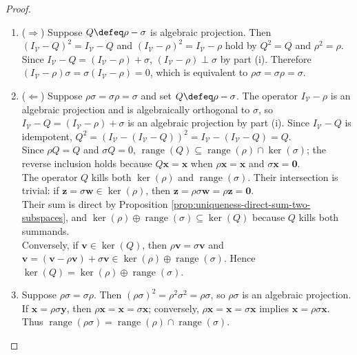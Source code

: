 \begin{theorem}
\begin{proof}
\begin{enumerate}[label=(\roman*)]
$(\rho+\sigma)\mathbf{v}=\mathbf{0}$ $\Rightarrow$ $\rho\mathbf{v}=\rho(\rho+\sigma)\mathbf{v}=\mathbf{0}$ and $\sigma\mathbf{v}=\sigma(\rho+\sigma)\mathbf{v}=\mathbf{0}$. Reverse implication is immediate. Thus $\ker(\rho+\sigma)=\ker(\rho)\cap\ker(\sigma)$.
\item[$(ii)$] ($\Rightarrow$) Suppose $Q\defeq\rho-\sigma$ is algebraic projection. Then $(I_{\mathcal{V}}-Q)^2=I_{\mathcal{V}}-Q$ and $(I_{\mathcal{V}}-\rho)^2=I_{\mathcal{V}}-\rho$ hold by $Q^2=Q$ and $\rho^2=\rho$.\\
Since $I_{\mathcal{V}}-Q=(I_{\mathcal{V}}-\rho)+\sigma$, $(I_{\mathcal{V}}-\rho)\perp\sigma$ by part (i). Therefore $(I_{\mathcal{V}}-\rho)\sigma=\sigma(I_{\mathcal{V}}-\rho)=0$, which is equivalent to $\rho\sigma=\sigma\rho=\sigma$.
\item[$(ii)$] ($\Leftarrow$) Suppose $\rho\sigma=\sigma\rho=\sigma$ and set $Q\defeq\rho-\sigma$. The operator $I_{\mathcal{V}}-\rho$ is an algebraic projection and is algebraically orthogonal to $\sigma$, so $I_{\mathcal{V}}-Q=(I_{\mathcal{V}}-\rho)+\sigma$ is an algebraic projection by part (i). Since $I_{\mathcal{V}}-Q$ is idempotent, $Q^2=(I_{\mathcal{V}}-(I_{\mathcal{V}}-Q))^2=I_{\mathcal{V}}-(I_{\mathcal{V}}-Q)=Q$.\\
Since $\rho Q=Q$ and $\sigma Q=0$, $\operatorname{range}(Q)\subseteq\operatorname{range}(\rho)\cap\ker(\sigma)$; the reverse inclusion holds because $Q\mathbf{x}=\mathbf{x}$ when $\rho\mathbf{x}=\mathbf{x}$ and $\sigma\mathbf{x}=\mathbf{0}$.\\
The operator $Q$ kills both $\ker(\rho)$ and $\operatorname{range}(\sigma)$. Their intersection is trivial: if $\mathbf{z}=\sigma\mathbf{w}\in\ker(\rho)$, then $\mathbf{z}=\rho\sigma\mathbf{w}=\rho\mathbf{z}=\mathbf{0}$.\\
Their sum is direct by Proposition \ref{prop:uniqueness-direct-sum-two-subspaces}, and $\ker(\rho)\oplus\operatorname{range}(\sigma)\subseteq\ker(Q)$ because $Q$ kills both summands.\\
Conversely, if $\mathbf{v}\in\ker(Q)$, then $\rho\mathbf{v}=\sigma\mathbf{v}$ and $\mathbf{v}=(\mathbf{v}-\rho\mathbf{v})+\sigma\mathbf{v}\in\ker(\rho)\oplus\operatorname{range}(\sigma)$. Hence $\ker(Q)=\ker(\rho)\oplus\operatorname{range}(\sigma)$.
\item[$(iii)$] Suppose $\rho\sigma=\sigma\rho$. Then $(\rho\sigma)^2=\rho^2\sigma^2=\rho\sigma$, so $\rho\sigma$ is an algebraic projection.\\
If $\mathbf{x}=\rho\sigma\mathbf{y}$, then $\rho\mathbf{x}=\mathbf{x}=\sigma\mathbf{x}$; conversely, $\rho\mathbf{x}=\mathbf{x}=\sigma\mathbf{x}$ implies $\mathbf{x}=\rho\sigma\mathbf{x}$. Thus $\operatorname{range}(\rho\sigma)=\operatorname{range}(\rho)\cap\operatorname{range}(\sigma)$.\\

\end{enumerate}
\end{proof}
\end{theorem}
